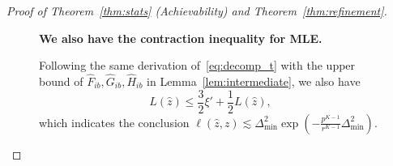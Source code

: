 \documentclass[journal]{IEEEtran}
\theoremstyle{definition}
\theoremstyle{definition}
\newcommand{\of}[1]{\left(#1\right)}
\newcounter{MYtempeqncnt}
\begin{document}
\begin{proof}[Proof of Theorem~\ref{thm:stats} (Achievability) and Theorem~\ref{thm:refinement}]
\begin{figure}[t]
     \textbf{We also have the contraction inequality for MLE.}
     
     Following the same derivation of~\eqref{eq:decomp_t} with the upper bound of $\hat F_{ib}, \hat G_{ib}, \hat H_{ib}$ in Lemma~\ref{lem:intermediate}, we also have
    \begin{equation}\label{eq:decomp_t_mle}
          L(\hat z) \leq \frac{3}{2} \xi'  + \frac{1}{2} L(\hat z),
    \end{equation}
    which indicates the conclusion $\ell(\hat z,z) \lesssim \Delta_{\min}^2  \exp \of{ - \frac{p^{K-1}}{r^{K-1}} \Delta_{\min}^2  }$.
\setcounter{equation}{\value{MYtempeqncnt}} 

\hrulefill 
\vspace*{4pt} 
\end{figure}
\setcounter{equation}{77} 
    

\end{proof}
\end{document}
